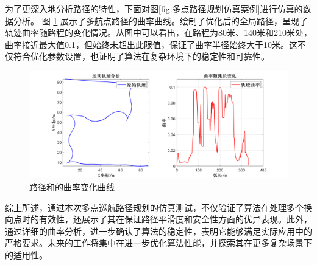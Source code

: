 \documentclass[master,academic]{ysuthesis} %
\begin{document}
		为了更深入地分析路径的特性，下面对图\ref{fig:多点路径规划仿真案例}进行仿真的数据分析。 图 \ref{fig:datamuti} 展示了多航点路径的曲率曲线。绘制了优化后的全局路径，呈现了轨迹曲率随路程的变化情况。从图中可以看出，在路程为80米、140米和210米处，曲率接近最大值0.1，但始终未超出此限值，保证了曲率半径始终大于10米。这不仅符合优化参数设置，也证明了算法在复杂环境下的稳定性和可靠性。
		
		\begin{figure}[H]
		\centering
		\includegraphics[width=1\textwidth]{datamuti.png}
		\caption{路径和的曲率变化曲线}
		\label{fig:datamuti}
		\end{figure}
		
		综上所述，通过本次多点巡航路径规划的仿真测试，不仅验证了算法在处理多个换向点时的有效性，还展示了其在保证路径平滑度和安全性方面的优异表现。此外，通过详细的曲率分析，进一步确认了算法的稳定性，表明它能够满足实际应用中的严格要求。未来的工作将集中在进一步优化算法性能，并探索其在更多复杂场景下的适用性。
\end{document}
